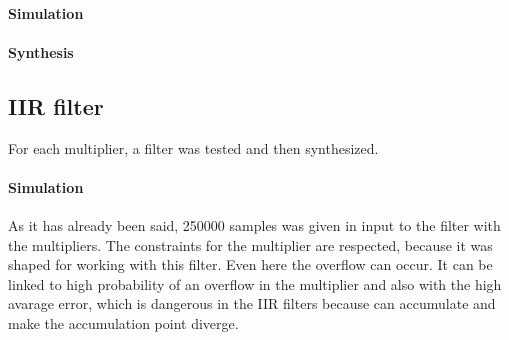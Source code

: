 \documentclass[a4paper]{article}
\begin{document}
	\paragraph*{Simulation} 

	\paragraph*{Synthesis} 

	\subsection{IIR filter}
	For each multiplier, a filter was tested and then synthesized.

	\paragraph*{Simulation} As it has already been said, 250000 samples was given in input to the filter with the multipliers. The constraints for the multiplier are respected, because it was shaped for working with this filter. 
	Even here the overflow can occur. It can be linked to high probability of an overflow in the multiplier and also with the high avarage error, which is dangerous in the IIR filters because can accumulate and make the accumulation point diverge. 
\end{document}
